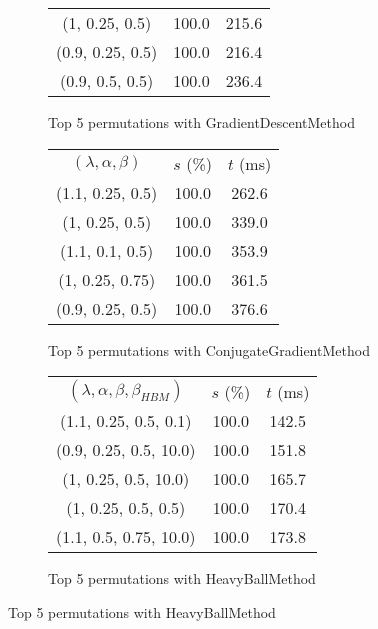 \begin{figure}[H]
\begin{subfigure}[ht]{.5\textwidth}
\begin{tabular}{|c|c|c|}
(1, 0.25, 0.5) & 100.0 & 215.6 \\
(0.9, 0.25, 0.5) & 100.0 & 216.4 \\
(0.9, 0.5, 0.5) & 100.0 & 236.4 \\
\hline
\end{tabular}
\caption{Top 5 permutations with GradientDescentMethod}
\label{subfig:param_comp_MatrixSquareSum_GradientDescentMethod_ArmijoSearch}
\end{subfigure}
\hfill
\begin{subfigure}[ht]{.5\textwidth}
\begin{tabular}{|c|c|c|}
\hline
\rowcolor{gray!25}
\multicolumn{3}{|c|}{ConjugateGradientMethod} \\
\hline
\rowcolor{gray!25}
$(\lambda,\alpha,\beta)$ & $s$ (\%) & $t$ (ms) \\
\hline
(1.1, 0.25, 0.5) & 100.0 & 262.6 \\
(1, 0.25, 0.5) & 100.0 & 339.0 \\
(1.1, 0.1, 0.5) & 100.0 & 353.9 \\
(1, 0.25, 0.75) & 100.0 & 361.5 \\
(0.9, 0.25, 0.5) & 100.0 & 376.6 \\
\hline
\end{tabular}
\caption{Top 5 permutations with ConjugateGradientMethod}
\label{subfig:param_comp_MatrixSquareSum_ConjugateGradientMethod_ArmijoSearch}
\end{subfigure}
\hfill
\begin{subfigure}[ht]{.5\textwidth}
\begin{tabular}{|c|c|c|}
\hline
\rowcolor{gray!25}
\multicolumn{3}{|c|}{HeavyBallMethod} \\
\hline
\rowcolor{gray!25}
$(\lambda,\alpha,\beta,\beta_{HBM})$ & $s$ (\%) & $t$ (ms) \\
\hline
(1.1, 0.25, 0.5, 0.1) & 100.0 & 142.5 \\
(0.9, 0.25, 0.5, 10.0) & 100.0 & 151.8 \\
(1, 0.25, 0.5, 10.0) & 100.0 & 165.7 \\
(1, 0.25, 0.5, 0.5) & 100.0 & 170.4 \\
(1.1, 0.5, 0.75, 10.0) & 100.0 & 173.8 \\
\hline
\end{tabular}
\caption{Top 5 permutations with HeavyBallMethod}
\label{subfig:param_comp_MatrixSquareSum_HeavyBallMethod_ArmijoSearch}
\end{subfigure}
\end{figure}

